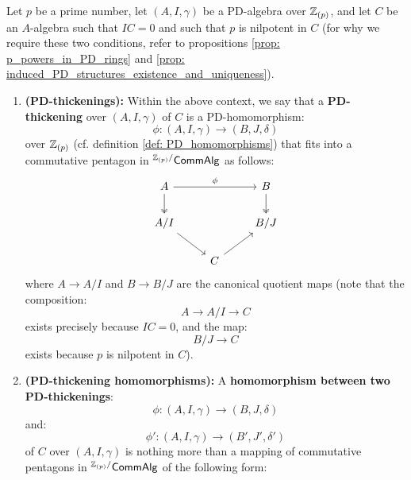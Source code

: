                 \begin{definition}[PD-thickenings] \label{def: PD_thickenings}
                    Let $p$ be a prime number, let $(A, I, \gamma)$ be a PD-algebra over $\mathbb{Z}_{(p)}$, and let $C$ be an $A$-algebra such that $IC = 0$ and such that $p$ is nilpotent in $C$ (for why we require these two conditions, refer to propositions \ref{prop: p_powers_in_PD_rings} and \ref{prop: induced_PD_structures_existence_and_uniqueness}). 
                        \begin{enumerate}
                            \item \textbf{(PD-thickenings):} Within the above context, we say that a \textbf{PD-thickening} over $(A, I, \gamma)$ of $C$ is a PD-homomorphism:
                                $$\phi: (A, I, \gamma) \to (B, J, \delta)$$
                            over $\mathbb{Z}_{(p)}$ (cf. definition \ref{def: PD_homomorphisms}) that fits into a commutative pentagon in ${}^{\mathbb{Z}_{(p)}/}\mathsf{Comm}\mathsf{Alg}$ as follows:
                                $$
                                    \begin{tikzcd}
                                    	A && B \\
                                    	{A/I} && {B/J} \\
                                    	& C
                                    	\arrow[two heads, from=1-1, to=2-1]
                                    	\arrow[two heads, from=1-3, to=2-3]
                                    	\arrow["\phi", from=1-1, to=1-3]
                                    	\arrow[from=2-1, to=3-2]
                                    	\arrow[from=3-2, to=2-3]
                                    \end{tikzcd}
                                $$
                            where $A \to A/I$ and $B \to B/J$ are the canonical quotient maps (note that the composition:
                                $$A \to A/I \to C$$
                            exists precisely because $IC = 0$, and the map:
                                $$B/J \to C$$
                            exists because $p$ is nilpotent in $C$). 
                            \item \textbf{(PD-thickening homomorphisms):} A \textbf{homomorphism between two PD-thickenings}:
                                $$\phi: (A, I, \gamma) \to (B, J, \delta)$$
                            and:
                                $$\phi': (A, I, \gamma) \to (B', J', \delta')$$
                            of $C$ over $(A, I, \gamma)$ is nothing more than a mapping of commutative pentagons in ${}^{\mathbb{Z}_{(p)}/}\mathsf{Comm}\mathsf{Alg}$ of the following form:

\end{enumerate}
\end{definition}
